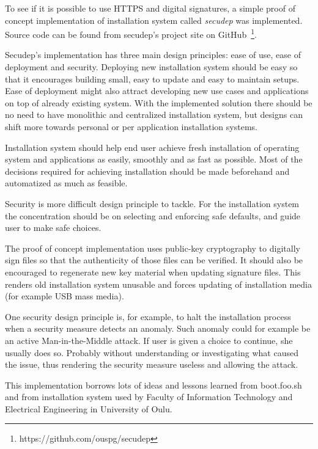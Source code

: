 
To see if it is possible to use HTTPS and digital signatures, a simple
proof of concept implementation of installation system
called \emph{secudep} was implemented. Source code can be found from
secudep's project site on
GitHub~\footnote{https://github.com/ouspg/secudep}.

Secudep's implementation has three main design principles: ease of
use, ease of deployment and security. Deploying new installation
system should be easy so that it encourages building small, easy to
update and easy to maintain setups. Ease of deployment might also
attract developing new use cases and applications on top of already
existing system. With the implemented solution there should be no need
to have monolithic and centralized installation system, but designs
can shift more towards personal or per application installation
systems.

Installation system should help end user achieve fresh installation of
operating system and applications as easily, smoothly and as fast as
possible. Most of the decisions required for achieving installation
should be made beforehand and automatized as much as feasible.

Security is more difficult design principle to tackle. For the
installation system the concentration should be on selecting and
enforcing safe defaults, and guide user to make safe choices.

The proof of concept implementation uses public-key cryptography to
digitally sign files so that the authenticity of those files can be
verified. It should also be encouraged to regenerate new key material
when updating signature files. This renders old installation system
unusable and forces updating of installation media (for example USB
mass media).

One security design principle is, for example, to halt the
installation process when a security measure detects an anomaly. Such
anomaly could for example be an active Man-in-the-Middle attack. If
user is given a choice to continue, she usually does so. Probably
without understanding or investigating what caused the issue, thus
rendering the security measure useless and allowing the attack.

This implementation borrows lots of ideas and lessons learned from
boot.foo.sh~\cite{boot-foo-sh} and from installation system
used by Faculty of Information Technology and Electrical Engineering
in University of Oulu.

